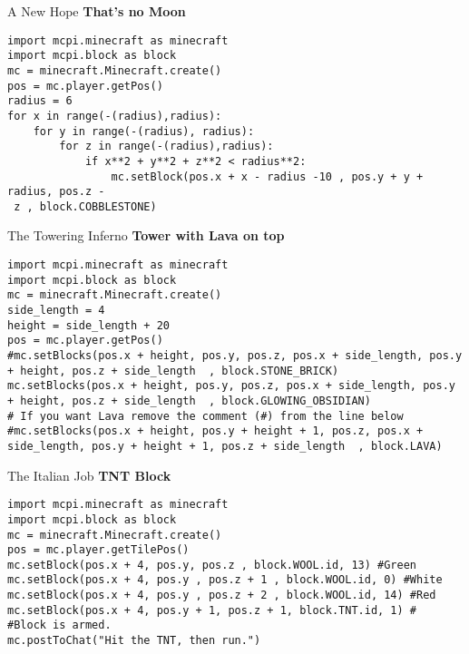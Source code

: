 \documentclass[flashcard_land,grid]{flashcards}
\begin{document}
\begin{flashcard}[API]{A New Hope}
{\bf That's no Moon}
\begin{lstlisting}
import mcpi.minecraft as minecraft
import mcpi.block as block
mc = minecraft.Minecraft.create()
pos = mc.player.getPos()
radius = 6
for x in range(-(radius),radius):
    for y in range(-(radius), radius):
        for z in range(-(radius),radius):
            if x**2 + y**2 + z**2 < radius**2:
                mc.setBlock(pos.x + x - radius -10 , pos.y + y + radius, pos.z -
 z , block.COBBLESTONE)
\end{lstlisting}
\end{flashcard}


\begin{flashcard}[API]{The Towering Inferno}
{\bf Tower with Lava on top}
\begin{lstlisting}
import mcpi.minecraft as minecraft
import mcpi.block as block
mc = minecraft.Minecraft.create()
side_length = 4
height = side_length + 20 
pos = mc.player.getPos()
#mc.setBlocks(pos.x + height, pos.y, pos.z, pos.x + side_length, pos.y + height, pos.z + side_length  , block.STONE_BRICK)
mc.setBlocks(pos.x + height, pos.y, pos.z, pos.x + side_length, pos.y + height, pos.z + side_length  , block.GLOWING_OBSIDIAN)
# If you want Lava remove the comment (#) from the line below
#mc.setBlocks(pos.x + height, pos.y + height + 1, pos.z, pos.x + side_length, pos.y + height + 1, pos.z + side_length  , block.LAVA) 
\end{lstlisting}
\end{flashcard}


\begin{flashcard}[API]{The Italian Job}
{\bf TNT Block }
\begin{lstlisting}
import mcpi.minecraft as minecraft
import mcpi.block as block
mc = minecraft.Minecraft.create()
pos = mc.player.getTilePos()
mc.setBlock(pos.x + 4, pos.y, pos.z , block.WOOL.id, 13) #Green
mc.setBlock(pos.x + 4, pos.y , pos.z + 1 , block.WOOL.id, 0) #White
mc.setBlock(pos.x + 4, pos.y , pos.z + 2 , block.WOOL.id, 14) #Red
mc.setBlock(pos.x + 4, pos.y + 1, pos.z + 1, block.TNT.id, 1) #
#Block is armed.
mc.postToChat("Hit the TNT, then run.")
\end{lstlisting}
\end{flashcard}
\end{document}
